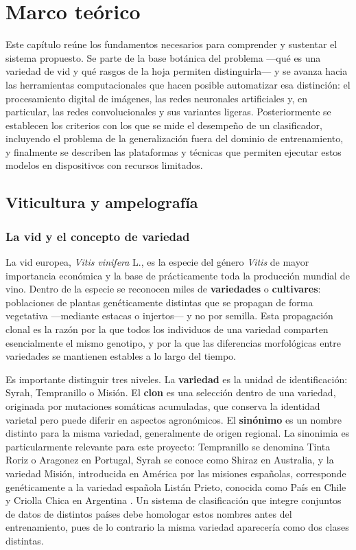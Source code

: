 \chapter{Marco teórico}

Este capítulo reúne los fundamentos necesarios para comprender y sustentar
el sistema propuesto. Se parte de la base botánica del problema —qué es una
variedad de vid y qué rasgos de la hoja permiten distinguirla— y se avanza
hacia las herramientas computacionales que hacen posible automatizar esa
distinción: el procesamiento digital de imágenes, las redes neuronales
artificiales y, en particular, las redes convolucionales y sus variantes
ligeras. Posteriormente se establecen los criterios con los que se mide el
desempeño de un clasificador, incluyendo el problema de la generalización
fuera del dominio de entrenamiento, y finalmente se describen las
plataformas y técnicas que permiten ejecutar estos modelos en dispositivos
con recursos limitados.

\section{Viticultura y ampelografía}

\subsection{La vid y el concepto de variedad}

La vid europea, \textit{Vitis vinifera} L., es la especie del género
\textit{Vitis} de mayor importancia económica y la base de prácticamente
toda la producción mundial de vino. Dentro de la especie se reconocen miles
de \textbf{variedades} o \textbf{cultivares}: poblaciones de plantas
genéticamente distintas que se propagan de forma vegetativa —mediante
estacas o injertos— y no por semilla. Esta propagación clonal es la razón
por la que todos los individuos de una variedad comparten esencialmente el
mismo genotipo, y por la que las diferencias morfológicas entre variedades
se mantienen estables a lo largo del tiempo.

Es importante distinguir tres niveles. La \textbf{variedad} es la unidad de
identificación: Syrah, Tempranillo o Misión. El \textbf{clon} es una
selección dentro de una variedad, originada por mutaciones somáticas
acumuladas, que conserva la identidad varietal pero puede diferir en
aspectos agronómicos. El \textbf{sinónimo} es un nombre distinto para la
misma variedad, generalmente de origen regional. La sinonimia es
particularmente relevante para este proyecto: Tempranillo se denomina Tinta
Roriz o Aragonez en Portugal, Syrah se conoce como Shiraz en Australia, y la
variedad Misión, introducida en América por las misiones españolas,
corresponde genéticamente a la variedad española Listán Prieto, conocida
como País en Chile y Criolla Chica en Argentina \citep{tapia2007}. Un
sistema de clasificación que integre conjuntos de datos de distintos países
debe homologar estos nombres antes del entrenamiento, pues de lo contrario
la misma variedad aparecería como dos clases distintas.

